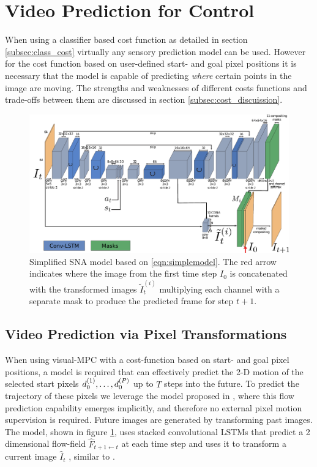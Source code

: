 \section{Video Prediction for Control}
When using a classifier based cost function as detailed in section \ref{subsec:class_cost} virtually any sensory prediction model can be used. However for the cost function based on user-defined start- and goal pixel positions it is necessary that the model is capable of predicting \emph{where} certain points in the image are moving. The strengths and weaknesses of different costs functions and trade-offs between them are discussed in section \ref{subsec:cost_discuission}.

\begin{figure}[t]
    \centering
    \includegraphics[width=\columnwidth]{images_sna/occlusionaware/occlusion_model.pdf}
    \caption{\small{Simplified SNA model based on \autoref{eqn:simplemodel}. The red arrow indicates where the image from the first time step $I_0$ is concatenated with the transformed images $\tilde{I}^{(i)}_t$ multiplying each channel with a separate mask to produce the predicted frame for step $t+1$.  }}      \label{fig:occlusion_model}
\end{figure}


\subsection{Video Prediction via Pixel Transformations}
\label{sec:model}
When using visual-MPC with a cost-function based on start- and goal pixel positions, a model is required that can effectively predict the 2-D motion of the selected start pixels $d_0^{(1)}, \dots, d_0^{(P)}$ up to $T$ steps into the future.
To predict the trajectory of these pixels we leverage the model proposed in \cite{finn_nips}, where this flow prediction capability emerges implicitly, and therefore no external pixel motion supervision is required. Future images are generated by transforming past images. The model, shown in figure \ref{fig:occlusion_model}, uses stacked convolutional LSTMs that predict a 2 dimensional flow-field $\hat{F}_{t+1 \leftarrow t}$ at each time step and uses it to transform a current image $\hat{I}_t$ , similar to \cite{zhou2016view}.

